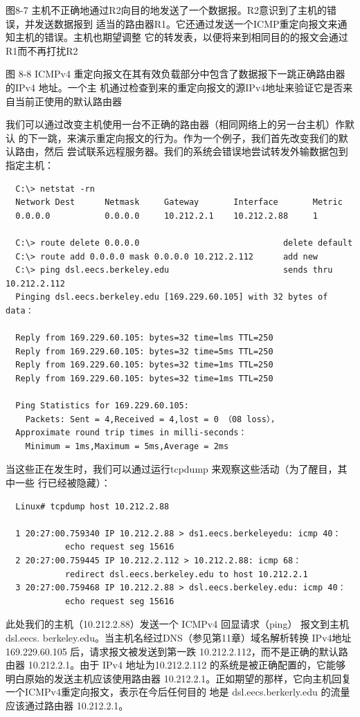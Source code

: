 图8-7 主机不正确地通过R2向目的地发送了一个数据报。R2意识到了主机的错误，并发送数据报到
适当的路由器R1。它还通过发送一个ICMP重定向报文来通知主机的错误。主机也期望调整
它的转发表，以便将来到相同目的的报文会通过R1而不再打扰R2

图 8-8 ICMPv4 重定向报文在其有效负载部分中包含了数据报下一跳正确路由器的IPv4 地址。一个主
机通过检查到来的重定向报文的源IPv4地址来验证它是否来自当前正使用的默认路由器

我们可以通过改变主机使用一台不正确的路由器（相同网络上的另一台主机）作默认
的下一跳，来演示重定向报文的行为。作为一个例子，我们首先改变我们的默认路由，然后
尝试联系远程服务器。我们的系统会错误地尝试转发外输数据包到指定主机：

\begin{verbatim}
  C:\> netstat -rn
  Network Dest      Netmask     Gateway       Interface       Metric
  0.0.0.0           0.0.0.0     10.212.2.1    10.212.2.88     1

  C:\> route delete 0.0.0.0                             delete default
  C:\> route add 0.0.0.0 mask 0.0.0.0 10.212.2.112      add new
  C:\> ping dsl.eecs.berkeley.edu                       sends thru 10.212.2.112
  Pinging dsl.eecs.berkeley.edu [169.229.60.105] with 32 bytes of data：

  Reply from 169.229.60.105: bytes=32 time=lms TTL=250
  Reply from 169.229.60.105: bytes=32 time=5ms TTL=250
  Reply from 169.229.60.105: bytes=32 time=1ms TTL=250
  Reply from 169.229.60.105: bytes=32 time=1ms TTL=250

  Ping Statistics for 169.229.60.105:
    Packets: Sent = 4,Received = 4,lost = 0 （08 loss），
  Approximate round trip times in milli-seconds：
    Minimum = 1ms,Maximum = 5ms,Average = 2ms
\end{verbatim}

当这些正在发生时，我们可以通过运行tcpdump 来观察这些活动（为了醒目，其中一些
行已经被隐藏）：

\begin{verbatim}
  Linux# tcpdump host 10.212.2.88

  1 20:27:00.759340 IP 10.212.2.88 > ds1.eecs.berkeleyedu: icmp 40：
            echo request seg 15616
  2 20:27:00.759445 IP 10.212.2.112 > 10.212.2.88: icmp 68：
            redirect dsl.eecs.berkeley.edu to host 10.212.2.1
  3 20:27:00.759468 IP 10.212.2.88 > dsl.eecs.berkeley.edu: icmp 40：
            echo request seg 15616
\end{verbatim}

此处我们的主机（10.212.2.88）发送一个 ICMPv4 回显请求（ping） 报文到主机 dsl.eecs.
berkeley.edu。当主机名经过DNS（参见第11章）域名解析转换 IPv4地址169.229.60.105
后，请求报文被发送到第一跌 10.212.2.112，而不是正确的默认路由器 10.212.2.1。由于 IPv4
地址为10.212.2.112 的系统是被正确配置的，它能够明白原始的发送主机应该使用路由器
10.212.2.1。正如期望的那样，它向主机回复一个ICMPv4重定向报文，表示在今后任何目的
地是 dsl.eecs.berkerly.edu 的流量应该通过路由器 10.212.2.1。

